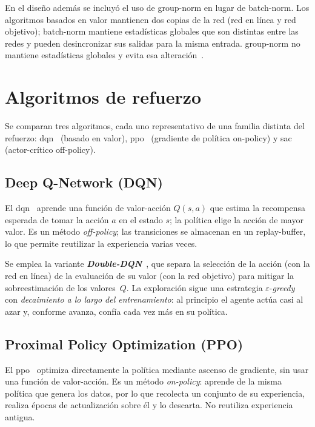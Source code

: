 En el diseño además se incluyó el uso de 
\gls{group-norm} en lugar de \gls{batch-norm}. Los algoritmos basados en valor mantienen
dos copias de la red (red en línea y red objetivo); \gls{batch-norm} mantiene estadísticas
globales que son distintas entre las redes y pueden desincronizar sus salidas para la misma entrada. 
\gls{group-norm} no mantiene estadísticas globales y evita esa alteración~\cite{DBLP:journals/ijcv/WuH20}.


\section{Algoritmos de refuerzo}
Se comparan tres algoritmos, cada uno representativo de una familia distinta del refuerzo:
\gls{dqn}~\cite{DBLP:journals/nature/MnihKSRVBGRFOPB15} (basado en valor),
\gls{ppo}~\cite{DBLP:journals/corr/SchulmanWDRK17} (gradiente de \gls{política} \gls{on-policy})
y \gls{sac}~\cite{DBLP:journals/corr/abs-1801-01290} (actor-crítico \gls{off-policy}).

\subsection{Deep Q-Network (DQN)}
\label{sec:rl-dqn}
El \gls{dqn}~\cite{DBLP:journals/nature/MnihKSRVBGRFOPB15} aprende una función de
valor-acción $Q(s,a)$ que estima la recompensa esperada de tomar la acción $a$
en el estado $s$; la \gls{política} elige la acción de mayor valor. Es un método
\textit{\gls{off-policy}}; las transiciones se almacenan en un \gls{replay-buffer}, 
lo que permite reutilizar la experiencia varias veces. 

Se emplea la variante \textbf{\textit{Double-DQN}}~\cite{DBLP:conf/aaai/HasseltGS16}, que separa la
selección de la acción (con la red en línea) de la evaluación de su valor (con la red
objetivo) para mitigar la sobreestimación de los valores~$Q$. La exploración
sigue una estrategia $\varepsilon$-\textit{greedy} con \emph{decaimiento a lo largo del
entrenamiento}: al principio el agente actúa casi al azar y, conforme avanza, confía cada
vez más en su \gls{política}. 

\subsection{Proximal Policy Optimization (PPO)}
\label{sec:rl-ppo}
El \gls{ppo}~\cite{DBLP:journals/corr/SchulmanWDRK17} optimiza directamente la
\gls{política} mediante ascenso de gradiente, sin usar una función de valor-acción. Es un
método \textit{\gls{on-policy}}: aprende de la misma \gls{política} que genera los datos, por lo
que recolecta un conjunto de su experiencia, realiza épocas de actualización
sobre él y lo descarta. No reutiliza experiencia antigua.

